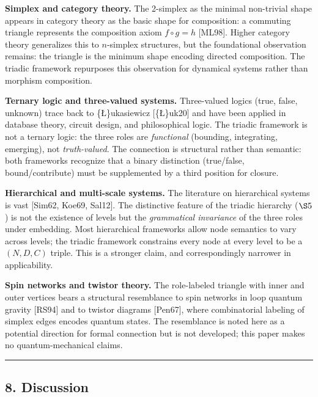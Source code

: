 \documentclass[
  11pt,
  letterpaper,
]{article}
\begin{document}
\textbf{Simplex and category theory.} The 2-simplex as the minimal
non-trivial shape appears in category theory as the basic shape for
composition: a commuting triangle represents the composition axiom
\(f \circ g = h\) {[}ML98{]}. Higher category theory generalizes this to
\(n\)-simplex structures, but the foundational observation remains: the
triangle is the minimum shape encoding directed composition. The triadic
framework repurposes this observation for dynamical systems rather than
morphism composition.

\textbf{Ternary logic and three-valued systems.} Three-valued logics
(true, false, unknown) trace back to \{\L\}ukasiewicz {[}\{\L\}uk20{]}
and have been applied in database theory, circuit design, and
philosophical logic. The triadic framework is not a ternary logic: the
three roles are \emph{functional} (bounding, integrating, emerging), not
\emph{truth-valued}. The connection is structural rather than semantic:
both frameworks recognize that a binary distinction (true/false,
bound/contribute) must be supplemented by a third position for closure.

\textbf{Hierarchical and multi-scale systems.} The literature on
hierarchical systems is vast {[}Sim62, Koe69, Sal12{]}. The distinctive
feature of the triadic hierarchy (\(\S 5\)) is not the existence of
levels but the \emph{grammatical invariance} of the three roles under
embedding. Most hierarchical frameworks allow node semantics to vary
across levels; the triadic framework constrains every node at every
level to be a \((N, D, C)\) triple. This is a stronger claim, and
correspondingly narrower in applicability.

\textbf{Spin networks and twistor theory.} The role-labeled triangle
with inner and outer vertices bears a structural resemblance to spin
networks in loop quantum gravity {[}RS94{]} and to twistor diagrams
{[}Pen67{]}, where combinatorial labeling of simplex edges encodes
quantum states. The resemblance is noted here as a potential direction
for formal connection but is not developed; this paper makes no
quantum-mechanical claims.

\begin{center}\rule{0.5\linewidth}{0.5pt}\end{center}

\subsection{8. Discussion}\label{discussion}
\end{document}

